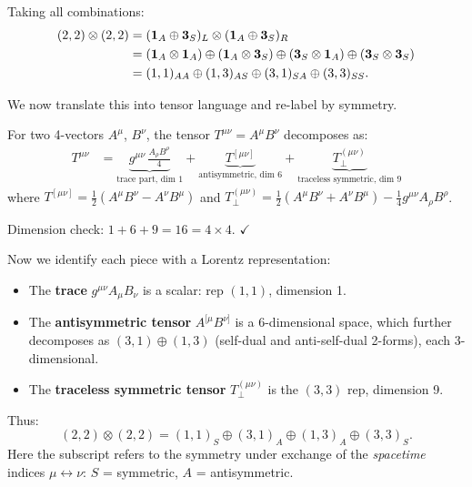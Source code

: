 Taking all combinations:
\begin{align}
  (2,2)\otimes(2,2)
  &= (\mathbf{1}_A \oplus \mathbf{3}_S)_L \otimes (\mathbf{1}_A \oplus \mathbf{3}_S)_R
  \notag\\
  &= (\mathbf{1}_A\otimes\mathbf{1}_A)
     \oplus (\mathbf{1}_A\otimes\mathbf{3}_S)
     \oplus (\mathbf{3}_S\otimes\mathbf{1}_A)
     \oplus (\mathbf{3}_S\otimes\mathbf{3}_S)
  \notag\\
  &= (1,1)_{AA} \oplus (1,3)_{AS} \oplus (3,1)_{SA} \oplus (3,3)_{SS}.
  \label{eq:22x22_raw}
\end{align}

\noindent We now translate this into tensor language and re-label by symmetry.

For two 4-vectors $A^\mu$, $B^\nu$, the tensor $T^{\mu\nu} = A^\mu B^\nu$ decomposes as:
\begin{align}
  T^{\mu\nu}
  &= \underbrace{g^{\mu\nu}\,\frac{A_\rho B^\rho}{4}}_{\text{trace part, dim }1}
   + \underbrace{T^{[\mu\nu]}}_{\text{antisymmetric, dim }6}
   + \underbrace{T^{(\mu\nu)}_\perp}_{\text{traceless symmetric, dim }9}
\end{align}
where $T^{[\mu\nu]} = \tfrac{1}{2}(A^\mu B^\nu - A^\nu B^\mu)$
and $T^{(\mu\nu)}_\perp = \tfrac{1}{2}(A^\mu B^\nu + A^\nu B^\mu) - \tfrac{1}{4}g^{\mu\nu}A_\rho B^\rho$.

Dimension check: $1 + 6 + 9 = 16 = 4\times 4$. $\checkmark$

Now we identify each piece with a Lorentz representation:
\begin{itemize}
  \item The \textbf{trace} $g^{\mu\nu}A_\mu B_\nu$ is a scalar: rep $(1,1)$, dimension 1.
  \item The \textbf{antisymmetric tensor} $A^{[\mu}B^{\nu]}$ is a 6-dimensional space,
        which further decomposes as $(3,1)\oplus(1,3)$ (self-dual and anti-self-dual
        2-forms), each 3-dimensional.
  \item The \textbf{traceless symmetric tensor} $T^{(\mu\nu)}_\perp$ is the $(3,3)$ rep,
        dimension 9.
\end{itemize}

Thus:
\begin{equation}
  \boxed{(2,2)\otimes(2,2) = (1,1)_S \oplus (3,1)_A \oplus (1,3)_A \oplus (3,3)_S.}
  \label{eq:22x22}
\end{equation}
Here the subscript refers to the symmetry under exchange of the \emph{spacetime}
indices $\mu \leftrightarrow \nu$:
$S$ = symmetric, $A$ = antisymmetric.

